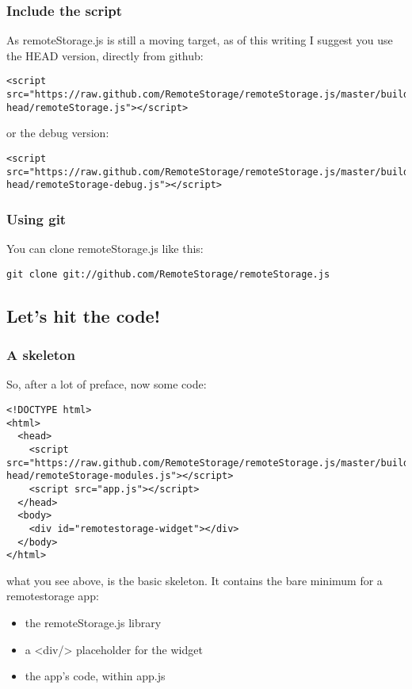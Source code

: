\documentclass[11pt]{article}
\begin{document}
\subsubsection{Include the script}
\label{sec-1-6-1}

    As remoteStorage.js is still a moving target, as of this writing I suggest you use the HEAD version, directly from github:

\begin{verbatim}
<script src="https://raw.github.com/RemoteStorage/remoteStorage.js/master/build/0.7.0-head/remoteStorage.js"></script>
\end{verbatim}
    or the debug version:

\begin{verbatim}
<script src="https://raw.github.com/RemoteStorage/remoteStorage.js/master/build/0.7.0-head/remoteStorage-debug.js"></script>
\end{verbatim}
\subsubsection{Using git}
\label{sec-1-6-2}

    You can clone remoteStorage.js like this:

\begin{verbatim}
git clone git://github.com/RemoteStorage/remoteStorage.js
\end{verbatim}
\subsection{Let's hit the code!}
\label{sec-1-7}
\subsubsection{A skeleton}
\label{sec-1-7-1}


    So, after a lot of preface, now some code:


\begin{verbatim}
<!DOCTYPE html>
<html>
  <head>
    <script src="https://raw.github.com/RemoteStorage/remoteStorage.js/master/build/0.7.0-head/remoteStorage-modules.js"></script>
    <script src="app.js"></script>
  </head>
  <body>
    <div id="remotestorage-widget"></div>
  </body>
</html>
\end{verbatim}

    what you see above, is the basic skeleton. It contains the bare minimum for a remotestorage app:
\begin{itemize}
\item the remoteStorage.js library
\item a <div/> placeholder for the widget
\item the app's code, within app.js
\end{itemize}
  
\end{document}
